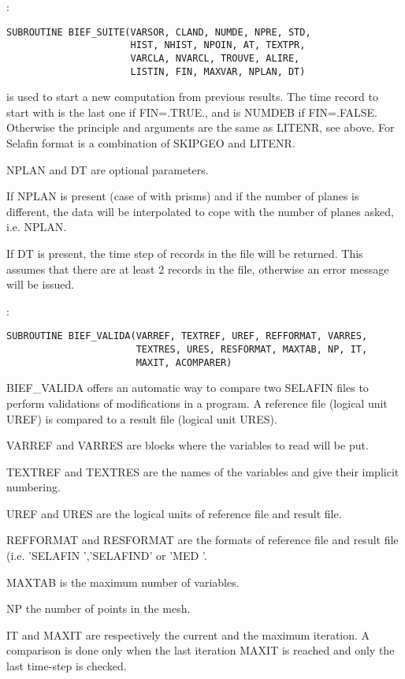 :
\begin{lstlisting}[language=TelFortran]
SUBROUTINE BIEF_SUITE(VARSOR, CLAND, NUMDE, NPRE, STD,
                      HIST, NHIST, NPOIN, AT, TEXTPR,
                      VARCLA, NVARCL, TROUVE, ALIRE,
                      LISTIN, FIN, MAXVAR, NPLAN, DT)
\end{lstlisting}

 is used to start a new computation from previous results.
The time record to start with is the last one if FIN=.TRUE., and is NUMDEB if
FIN=.FALSE. Otherwise the principle and arguments are the same as LITENR, see
above. For Selafin format  is a combination of SKIPGEO and
LITENR.

NPLAN and DT are optional parameters.

If NPLAN is present (case of  with prisms) and if the number of
planes is different, the data will be interpolated to cope with the number of
planes asked, i.e. NPLAN.

If DT is present, the time step of records in the file will be returned. This
assumes that there are at least 2 records in the file, otherwise an error
message will be issued.

:
\begin{lstlisting}[language=TelFortran]
SUBROUTINE BIEF_VALIDA(VARREF, TEXTREF, UREF, REFFORMAT, VARRES,
                       TEXTRES, URES, RESFORMAT, MAXTAB, NP, IT,
                       MAXIT, ACOMPARER)
\end{lstlisting}

BIEF\_VALIDA offers an automatic way to compare two SELAFIN files to perform
validations of modifications in a program. A reference file (logical unit UREF)
is compared to a result file (logical unit URES).

VARREF and VARRES are blocks where the variables to read will be put.

TEXTREF and TEXTRES are the names of the variables and give their implicit
numbering.

UREF and URES are the logical units of reference file and result file.

REFFORMAT and RESFORMAT are the formats of reference file and result file (i.e.
'SELAFIN ','SELAFIND' or 'MED     '.

MAXTAB is the maximum number of variables.

NP the number of points in the mesh.

IT and MAXIT are respectively the current and the maximum iteration. A
comparison is done only when the last iteration MAXIT is reached and only the
last time-step is checked.

